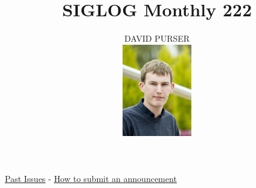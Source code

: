 \documentclass[prodmode,acmtecs]{acmsmall} %
\newcounter{colstart}
\begin{document}
\setcounter{colstart}{\thepage}

\title{\huge\sc SIGLOG Monthly 222}
\author{DAVID PURSER
\vspace*{-2.6cm}\begin{flushright}\includegraphics[width=30mm]{dp}\end{flushright}
}

\maketitlee

\href{https://lics.siglog.org/newsletters/}{Past Issues}
 - 
\href{https://lics.siglog.org/newsletters/inst.html}{How to submit an announcement}
\end{document}
